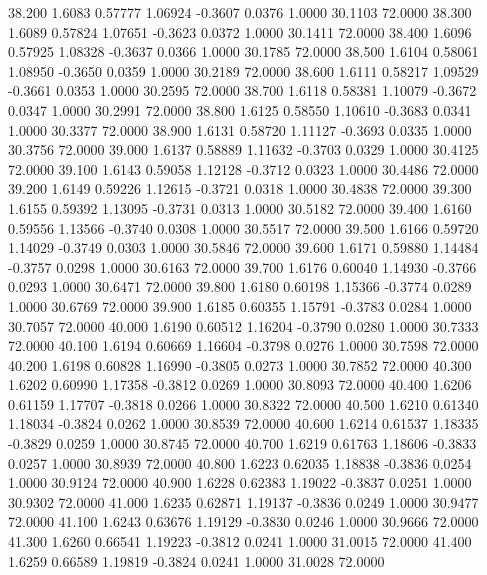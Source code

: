   38.200   1.6083   0.57777   1.06924  -0.3607   0.0376   1.0000  30.1103  72.0000
  38.300   1.6089   0.57824   1.07651  -0.3623   0.0372   1.0000  30.1411  72.0000
  38.400   1.6096   0.57925   1.08328  -0.3637   0.0366   1.0000  30.1785  72.0000
  38.500   1.6104   0.58061   1.08950  -0.3650   0.0359   1.0000  30.2189  72.0000
  38.600   1.6111   0.58217   1.09529  -0.3661   0.0353   1.0000  30.2595  72.0000
  38.700   1.6118   0.58381   1.10079  -0.3672   0.0347   1.0000  30.2991  72.0000
  38.800   1.6125   0.58550   1.10610  -0.3683   0.0341   1.0000  30.3377  72.0000
  38.900   1.6131   0.58720   1.11127  -0.3693   0.0335   1.0000  30.3756  72.0000
  39.000   1.6137   0.58889   1.11632  -0.3703   0.0329   1.0000  30.4125  72.0000
  39.100   1.6143   0.59058   1.12128  -0.3712   0.0323   1.0000  30.4486  72.0000
  39.200   1.6149   0.59226   1.12615  -0.3721   0.0318   1.0000  30.4838  72.0000
  39.300   1.6155   0.59392   1.13095  -0.3731   0.0313   1.0000  30.5182  72.0000
  39.400   1.6160   0.59556   1.13566  -0.3740   0.0308   1.0000  30.5517  72.0000
  39.500   1.6166   0.59720   1.14029  -0.3749   0.0303   1.0000  30.5846  72.0000
  39.600   1.6171   0.59880   1.14484  -0.3757   0.0298   1.0000  30.6163  72.0000
  39.700   1.6176   0.60040   1.14930  -0.3766   0.0293   1.0000  30.6471  72.0000
  39.800   1.6180   0.60198   1.15366  -0.3774   0.0289   1.0000  30.6769  72.0000
  39.900   1.6185   0.60355   1.15791  -0.3783   0.0284   1.0000  30.7057  72.0000
  40.000   1.6190   0.60512   1.16204  -0.3790   0.0280   1.0000  30.7333  72.0000
  40.100   1.6194   0.60669   1.16604  -0.3798   0.0276   1.0000  30.7598  72.0000
  40.200   1.6198   0.60828   1.16990  -0.3805   0.0273   1.0000  30.7852  72.0000
  40.300   1.6202   0.60990   1.17358  -0.3812   0.0269   1.0000  30.8093  72.0000
  40.400   1.6206   0.61159   1.17707  -0.3818   0.0266   1.0000  30.8322  72.0000
  40.500   1.6210   0.61340   1.18034  -0.3824   0.0262   1.0000  30.8539  72.0000
  40.600   1.6214   0.61537   1.18335  -0.3829   0.0259   1.0000  30.8745  72.0000
  40.700   1.6219   0.61763   1.18606  -0.3833   0.0257   1.0000  30.8939  72.0000
  40.800   1.6223   0.62035   1.18838  -0.3836   0.0254   1.0000  30.9124  72.0000
  40.900   1.6228   0.62383   1.19022  -0.3837   0.0251   1.0000  30.9302  72.0000
  41.000   1.6235   0.62871   1.19137  -0.3836   0.0249   1.0000  30.9477  72.0000
  41.100   1.6243   0.63676   1.19129  -0.3830   0.0246   1.0000  30.9666  72.0000
  41.300   1.6260   0.66541   1.19223  -0.3812   0.0241   1.0000  31.0015  72.0000
  41.400   1.6259   0.66589   1.19819  -0.3824   0.0241   1.0000  31.0028  72.0000
